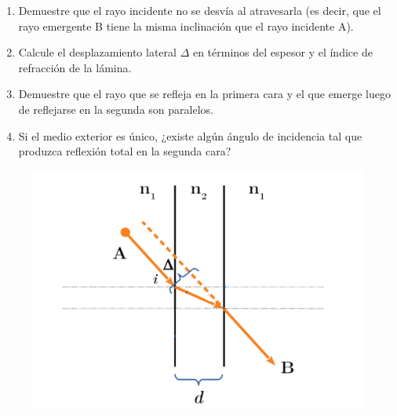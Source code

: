 \documentclass[11pt,spanish]{article}
\begin{document}
\begin{enumerate}
\begin{enumerate}
        \item Demuestre que el rayo incidente no se desvía al atravesarla (es
        decir, que el rayo emergente B tiene la misma inclinación que el rayo
        incidente A).
        
        \item Calcule el desplazamiento lateral $\Delta$ en términos del espesor
        y el índice de refracción de la lámina.

        \item Demuestre que el rayo que se refleja en la primera cara y el que
        emerge luego de reflejarse en la segunda son paralelos.
        
        \item Si el medio exterior es único, ¿existe algún ángulo de incidencia
        tal que produzca reflexión total en la segunda cara?

    \end{enumerate}
    
    \begin{figure}[H]
        \centering{}\includegraphics[clip,scale=0.15]{figs/a-000.png}
    \end{figure}



\end{enumerate}
\end{document}
